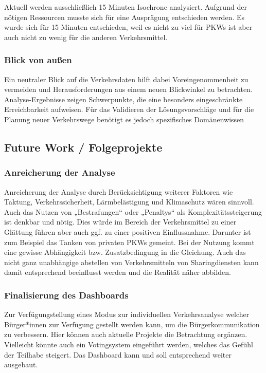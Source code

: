 Aktuell werden ausschließlich 15 Minuten Isochrone analysiert​. Aufgrund der nötigen Ressourcen musste sich für eine Ausprägung entschieden werden.
Es wurde sich für 15 Minuten entschieden, weil es nicht zu viel für PKWs ist aber auch nicht zu wenig für die anderen Verkehrsmittel.


\subsubsection{Blick von außen}
Ein neutraler Blick auf die Verkehrsdaten hilft dabei Voreingenommenheit zu vermeiden und Herausforderungen aus einem neuen Blickwinkel zu betrachten.​
Analyse-Ergebnisse zeigen Schwerpunkte, die eine besonders eingeschränkte Erreichbarkeit aufweisen. Für das Validieren der Lösungsvorschläge und für die Planung neuer Verkehrswege benötigt es jedoch spezifisches Domänenwissen​


\subsection{Future Work / Folgeprojekte}

\subsubsection{Anreicherung der Analyse}
Anreicherung der Analyse durch Berücksichtigung weiterer Faktoren wie Taktung, Verkehrssicherheit, Lärmbelästigung und Klimaschutz wären sinnvoll.
Auch das Nutzen von „Bestrafungen“ oder „Penaltys“ als Komplexitätssteigerung ist denkbar und nötig. Dies würde im Bereich der Verkehrsmittel zu einer Glättung führen aber auch ggf. zu einer positiven Einflussnahme.
Darunter ist zum Beispiel das Tanken von privaten PKWs gemeint. Bei der Nutzung kommt eine gewisse Abhängigkeit bzw. Zusatzbedingung in die Gleichung.
Auch das nicht ganz unabhängige abstellen von Verkehrsmitteln von Sharingdiensten kann damit entsprechend beeinflusst werden und die Realität näher abbilden.


\subsubsection{Finalisierung des Dashboards}
Zur Verfügungstellung eines Modus zur individuellen Verkehrsanalyse welcher Bürger*innen zur Verfügung gestellt werden kann, um die Bürgerkommunikation zu verbessern.
Hier können auch aktuelle Projekte die Betrachtung ergänzen. Vielleicht könnte auch ein Votingsystem eingeführt werden, welches das Gefühl der Teilhabe steigert.
Das Dashboard kann und soll entsprechend weiter ausgebaut. 

